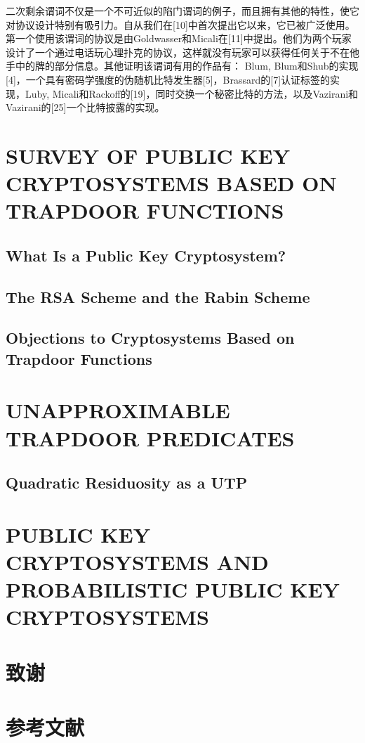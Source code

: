 \documentclass[]{article}
\begin{document}
二次剩余谓词不仅是一个不可近似的陷门谓词的例子，而且拥有其他的特性，使它对协议设计特别有吸引力。自从我们在[10]中首次提出它以来，它已被广泛使用。第一个使用该谓词的协议是由Goldwasser和Micali在[11]中提出。他们为两个玩家设计了一个通过电话玩心理扑克的协议，这样就没有玩家可以获得任何关于不在他手中的牌的部分信息。其他证明该谓词有用的作品有： Blum, Blum和Shub的实现[4]，一个具有密码学强度的伪随机比特发生器[5]，Brassard的[7]认证标签的实现，Luby, Micali和Rackoff的[19]，同时交换一个秘密比特的方法，以及Vazirani和Vazirani的[25]一个比特披露的实现。

\section{SURVEY OF PUBLIC KEY CRYPTOSYSTEMS BASED ON TRAPDOOR FUNCTIONS}


\subsection{What Is a Public Key Cryptosystem?}




\subsection{The RSA Scheme and the Rabin Scheme}



\subsection{Objections to Cryptosystems Based on Trapdoor Functions}



\section{UNAPPROXIMABLE TRAPDOOR PREDICATES}

\subsection{Quadratic Residuosity as a UTP}

\section{PUBLIC KEY CRYPTOSYSTEMS AND PROBABILISTIC	PUBLIC KEY CRYPTOSYSTEMS}

\section*{致谢}

\section*{参考文献}
\end{document}
